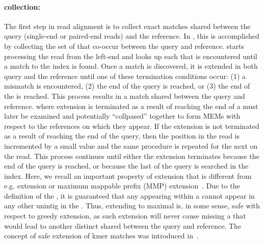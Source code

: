 \paragraph{\unimem collection:}
The first step in read alignment is to collect exact matches shared
between the query (single-end or paired-end reads) and the reference.
In \puffaligner, this is accomplished by collecting the set of
\unimems that co-occur between the query and reference. \puffaligner
starts processing the read from the left-end and
looks up each \kmer that is encountered until a match to the index is
found. Once a match is discovered, it is extended in both query and the reference 
until one of these termination conditions occur: (1) a mismatch is encountered, 
(2) the end of the query is reached, or (3) the end of the
\unitig is reached. This process results in a \unimem match shared
between the query and reference. \unimems where extension is terminated
as a result of reaching the end of a \unitig must later be 
examined and potentially ``collpased'' together to form MEMs with respect
to the references on which they appear. If the \unimem extension is not
terminated as a result of reaching the end of the query, then the
position in the read is incremented by a small value and the same procedure is repeated
for the next \kmer on the read. This process continues until either
the \unimem extension terminates because the end of the query is
reached, or because the last \kmer of the query is searched in the index.
Here, we recall an important property of \unimem extension that is
different from e.g. \mem extension or maximum mappable prefix (MMP)
extension~\citep{star}. Due to the definition of the \ccdbgshort, it
is guaranteed that any \kmer appearing within a \unimem cannot appear
in any other unintig in the \ccdbgshort. Thus, extending \kmers to
maximal \unimems is, in some sense, safe with respect to greedy
extension, as such extension will never cause missing a \kmer that
would lead to another distinct \unimem shared between the query and
reference. The concept of safe extension of kmer matches was introduced in~\citep{selaln}.

